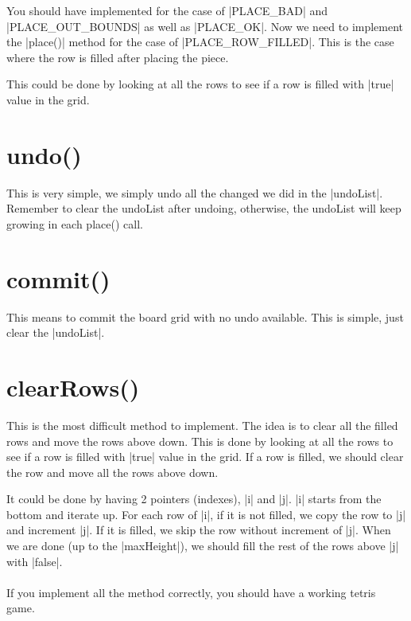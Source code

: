 \documentclass[letterpaper,12pt]{article}
\renewcommand{\verb}{\collectverb{\color{codegreen}}}
\begin{document}
You should have implemented for the case of \verb|PLACE_BAD| and \verb|PLACE_OUT_BOUNDS| as well as \verb|PLACE_OK|. Now we need to implement the \verb|place()| method for the case of \verb|PLACE_ROW_FILLED|. This is the case where the row is filled after placing the piece.

This could be done by looking at all the rows to see if a row is filled with \verb|true| value in the grid.
 
\section{undo()}
This is very simple, we simply undo all the changed we did in the \verb|undoList|. Remember to clear the undoList after undoing,
otherwise, the undoList will keep growing in each place() call.

\section{commit()}
This means to commit the board grid with no undo available. This is simple, just clear the \verb|undoList|.

\section{clearRows()}
This is the most difficult method to implement. The idea is to clear all the filled rows and move the rows above down. This is done by looking at all the rows to see if a row is filled with \verb|true| value in the grid. If a row is filled, we should clear the row and move all the rows above down.

It could be done by having 2 pointers (indexes), \verb|i| and \verb|j|. \verb|i| starts from the bottom and iterate up. For each row of \verb|i|, if it is not filled, we copy the row to \verb|j| and increment \verb|j|. If it is filled, we skip the row without increment of \verb|j|. When we are done (up to the \verb|maxHeight|), we should fill the rest of the rows above \verb|j| with \verb|false|.

\paragraph{}

If you implement all the method correctly, you should have a working tetris game.
\end{document}
